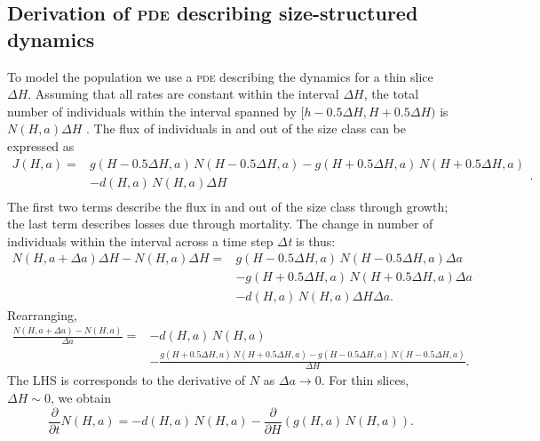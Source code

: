 \documentclass[10pt,twoside]{article}
\begin{document}
\subsection{Derivation of \textsc{pde} describing size-structured
dynamics}\label{derivation-of-pde-describing-size-structured-dynamics}

To model the population we use a \textsc{pde} describing the dynamics for a thin
slice \(\Delta H\). Assuming that all rates are constant within the
interval \(\Delta H\), the total number of individuals within the
interval spanned by \([h - 0.5\Delta H, H + 0.5\Delta H)\) is
\(N(H, a)\Delta H\) . The flux of individuals in and out of the size
class can be expressed as
\begin{equation}\begin{array}{ll} J(H, a) = &g(H - 0.5 \Delta H, a) \, N(H - 0.5 \Delta H, a) - g(H + 0.5 \Delta H, a) \, N(H + 0.5 \Delta H, a) \\ & - d (H, a) \, N(H, a)\Delta H\\ \end{array}.
\end{equation}
The first two terms describe the flux in and out of the size class
through growth; the last term describes losses due through mortality.
The change in number of individuals within the interval across a time
step \textit{$\Delta $t} is thus:
\begin{equation}
  \begin{array}{ll} N(H, a + \Delta a)\Delta H - N(H, a)\Delta H = &g(H - 0.5 \Delta H, a) \, N(H - 0.5 \Delta H, a)\Delta a \\ & - g(H + 0.5 \Delta H, a) \, N(H + 0.5 \Delta H, a)\Delta a\\& - d (H, a) \, N(H, a)\Delta H\Delta a.
  \end{array}
\end{equation}
Rearranging,
\begin{equation}
  \begin{array}{ll}
  \frac{N(H, a + \Delta a) - N(H, a)}{\Delta a} = & - d (H, a) \, N(H, a) \\
  & - \frac{g(H + 0.5 \Delta H, a) \, N(H + 0.5 \Delta H, a) - g(H - 0.5 \Delta H, a) \, N(H - 0.5 \Delta H, a)}{\Delta H}.
  \end{array}
\end{equation}
The LHS is corresponds to the derivative of \(N\) as \(\Delta a\to 0\).
For thin slices, \(\Delta H \sim 0\), we obtain
\begin{equation} \label{eq:PDE-app}
  \frac{\partial}{\partial t} N(H, a) = - d (H, a) \, N(H, a) - \frac{\partial}{\partial H} (g(H, a) \, N(H, a)).
\end{equation}
\end{document}
